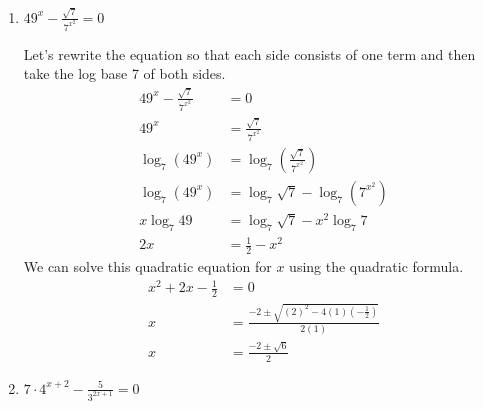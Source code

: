 \documentclass{article}
\begin{document}
\begin{enumerate}[resume]
\begin{enumerate}
  \item
    \begin{problem}[\vfill]
      $\displaystyle 49^{x} - \frac{\sqrt{7}}{7^{x^2}} = 0$
    \end{problem}

    \begin{solution}
      Let's rewrite the equation so that each side consists of
      one term and then take the log base 7 of both sides.
      \begin{align*}
          49^{x} - \frac{\sqrt{7}}{7^{x^2}} &= 0 \\
          49^x &= \frac{\sqrt{7}}{7^{x^2}} \\
          \log_7(49^x) &= \log_7\!\left(\frac{\sqrt{7}}{7^{x^2}}\right)\\
          \log_7 (49^x) &= \log_7 \sqrt{7} - 
            \log_7 \left(7^{x^2}\right)\\
          x \log_7 49 &= \log_7 \sqrt{7} - x^2 \log_7 7 \\
          2x &= \tfrac{1}{2} - x^2
      \end{align*}
      We can solve this quadratic equation for $x$ using
      the quadratic formula.
      \begin{align*}
          x^2 + 2x - \tfrac{1}{2} &= 0 \\
          x &= \frac{-2 \pm \sqrt{(2)^2 - 4(1)(-\tfrac{1}{2})}}{2(1)} \\
          x &= \boxed{\frac{-2 \pm \sqrt{6}}{2}}
      \end{align*}

      
    \end{solution}

  \item

    \begin{problem}[\vfill]
      $\displaystyle 7 \cdot 4^{x + 2} - \frac{5}{3^{2x + 1}} = 0$
    \end{problem}


\end{enumerate}
\end{enumerate}
\end{document}
